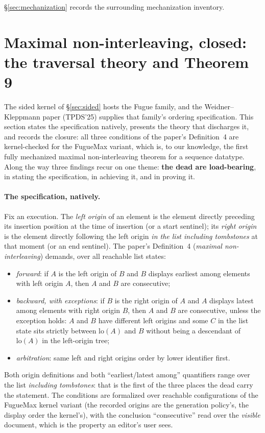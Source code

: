 \documentclass[11pt]{article}
\begin{document}
\noindent \S\ref{sec:mechanization} records the surrounding
mechanization inventory.

\section{Maximal non-interleaving, closed: the traversal theory and
Theorem 9}
\label{sec:theorem9}

The sided kernel of \S\ref{sec:sided} hosts the Fugue family, and the
Weidner--Kleppmann paper (TPDS'25) supplies that family's ordering
specification. This section states the specification natively, presents
the theory that discharges it, and records the closure: all three
conditions of the paper's Definition~4 are kernel-checked for the
FugueMax variant, which is, to our knowledge, the first fully
mechanized maximal non-interleaving theorem for a sequence datatype.
Along the way three findings recur on one theme: \textbf{the dead are
load-bearing}, in stating the specification, in achieving it, and in
proving it.

\paragraph{The specification, natively.} Fix an execution. The
\emph{left origin} of an element is the element directly preceding its
insertion position at the time of insertion (or a start sentinel); its
\emph{right origin} is the element directly following the left origin
\emph{in the list including tombstones} at that moment (or an end
sentinel). The paper's Definition~4 (\emph{maximal non-interleaving})
demands, over all reachable list states:
\begin{itemize}[leftmargin=2em]
\item[(1)] \emph{forward}: if $A$ is the left origin of $B$ and $B$
  displays earliest among elements with left origin $A$, then $A$ and
  $B$ are consecutive;
\item[(2)] \emph{backward, with exceptions}: if $B$ is the right origin
  of $A$ and $A$ displays latest among elements with right origin $B$,
  then $A$ and $B$ are consecutive, unless the exception holds: $A$ and
  $B$ have different left origins and some $C$ in the list state sits
  strictly between $\mathrm{lo}(A)$ and $B$ without being a descendant
  of $\mathrm{lo}(A)$ in the left-origin tree;
\item[(3)] \emph{arbitration}: same left and right origins order by
  lower identifier first.
\end{itemize}
Both origin definitions and both ``earliest/latest among'' quantifiers
range over the list \emph{including tombstones}: that is the first of
the three places the dead carry the statement. The conditions are
formalized over reachable configurations of the FugueMax kernel variant
(the recorded origins are the generation policy's, the display order
the kernel's), with the conclusion ``consecutive'' read over the
\emph{visible} document, which is the property an editor's user sees.
\end{document}
